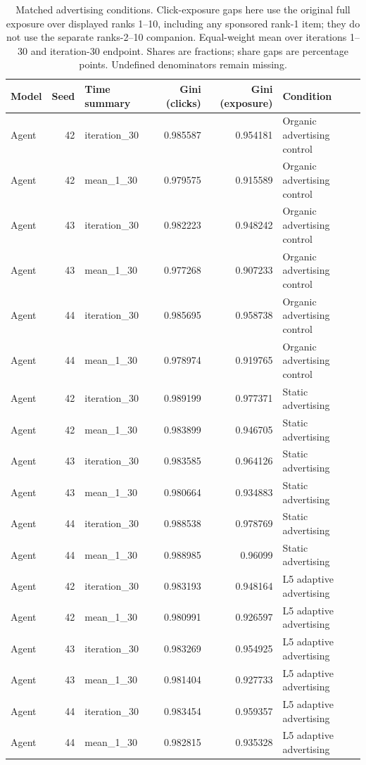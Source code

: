 \begin{table}[htbp!]
\centering
\small
\setlength{\tabcolsep}{3pt}
\renewcommand{\arraystretch}{1.1}
\begin{tabular}{lrlrrl}
\hline
Model & Seed & Time summary & Gini (clicks) & Gini (exposure) & Condition \\
\hline
Agent & 42 & iteration\_30 & 0.985587 & 0.954181 & Organic advertising control \\
Agent & 42 & mean\_1\_30 & 0.979575 & 0.915589 & Organic advertising control \\
Agent & 43 & iteration\_30 & 0.982223 & 0.948242 & Organic advertising control \\
Agent & 43 & mean\_1\_30 & 0.977268 & 0.907233 & Organic advertising control \\
Agent & 44 & iteration\_30 & 0.985695 & 0.958738 & Organic advertising control \\
Agent & 44 & mean\_1\_30 & 0.978974 & 0.919765 & Organic advertising control \\
Agent & 42 & iteration\_30 & 0.989199 & 0.977371 & Static advertising \\
Agent & 42 & mean\_1\_30 & 0.983899 & 0.946705 & Static advertising \\
Agent & 43 & iteration\_30 & 0.983585 & 0.964126 & Static advertising \\
Agent & 43 & mean\_1\_30 & 0.980664 & 0.934883 & Static advertising \\
Agent & 44 & iteration\_30 & 0.988538 & 0.978769 & Static advertising \\
Agent & 44 & mean\_1\_30 & 0.988985 & 0.96099 & Static advertising \\
Agent & 42 & iteration\_30 & 0.983193 & 0.948164 & L5 adaptive advertising \\
Agent & 42 & mean\_1\_30 & 0.980991 & 0.926597 & L5 adaptive advertising \\
Agent & 43 & iteration\_30 & 0.983269 & 0.954925 & L5 adaptive advertising \\
Agent & 43 & mean\_1\_30 & 0.981404 & 0.927733 & L5 adaptive advertising \\
Agent & 44 & iteration\_30 & 0.983454 & 0.959357 & L5 adaptive advertising \\
Agent & 44 & mean\_1\_30 & 0.982815 & 0.935328 & L5 adaptive advertising \\
\hline
\end{tabular}
\caption{Matched advertising conditions. Click-exposure gaps here use the original full exposure over displayed ranks 1--10, including any sponsored rank-1 item; they do not use the separate ranks-2--10 companion. Equal-weight mean over iterations 1--30 and iteration-30 endpoint. Shares are fractions; share gaps are percentage points. Undefined denominators remain missing.}
\label{chap:results:tab:rq1_advertising_concentration}
\end{table}
